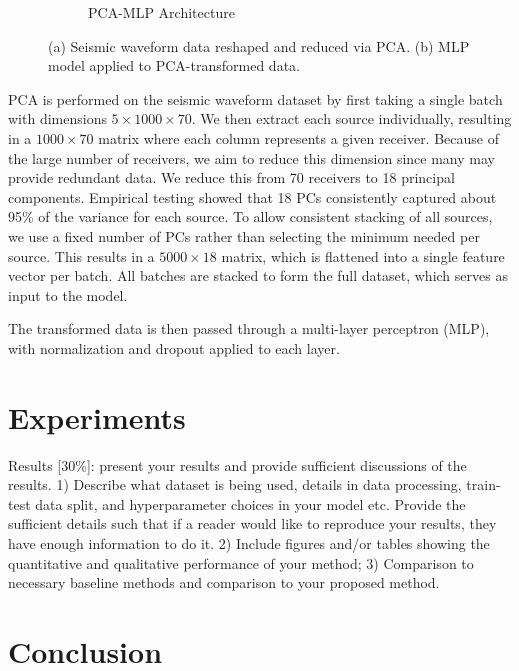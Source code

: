 \documentclass{article}
\newcommand{\instructions}[1]{{\color{blue} #1}}
\begin{document}
\begin{figure}
\begin{subfigure}[b]{0.45\linewidth}
        \caption{PCA-MLP Architecture}
    \end{subfigure}
    \caption{(a) Seismic waveform data reshaped and reduced via PCA. (b) MLP model applied to PCA-transformed data.}
    \label{fig:pca}
\end{figure}

PCA is performed on the seismic waveform dataset by first taking a single batch with dimensions $5 \times 1000 \times 70$. We then extract each source individually, resulting in a $1000 \times 70$ matrix where each column represents a given receiver. Because of the large number of receivers, we aim to reduce this dimension since many may provide redundant data. We reduce this from 70 receivers to 18 principal components. Empirical testing showed that 18 PCs consistently captured about 95\% of the variance for each source. To allow consistent stacking of all sources, we use a fixed number of PCs rather than selecting the minimum needed per source. This results in a $5000 \times 18$ matrix, which is flattened into a single feature vector per batch. All batches are stacked to form the full dataset, which serves as input to the model.

The transformed data is then passed through a multi-layer perceptron (MLP), with normalization and dropout applied to each layer.

\section{Experiments}
\instructions{Results [30\%]: present your results and provide sufficient discussions of the results. 1) Describe what dataset is being used, details in data processing, train-test data split, and hyperparameter choices in your model etc. Provide the sufficient details such that if a reader would like to reproduce your results, they have enough information to do it. 2) Include figures and/or tables showing the quantitative and qualitative performance of your method; 3) Comparison to necessary baseline methods and comparison to your proposed method.} 

\section{Conclusion}
\end{document}

